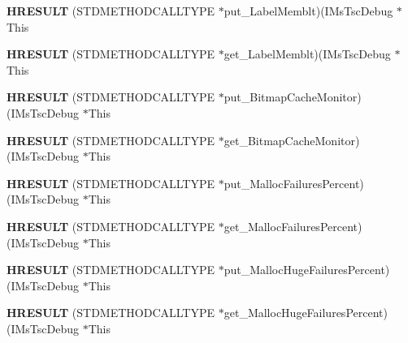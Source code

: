 \begin{DoxyCompactItemize}
{\bfseries H\+R\+E\+S\+U\+LT} (S\+T\+D\+M\+E\+T\+H\+O\+D\+C\+A\+L\+L\+T\+Y\+PE $\ast$put\+\_\+\+Label\+Memblt)(I\+Ms\+Tsc\+Debug $\ast$This
\item 
\mbox{\label{struct_i_ms_tsc_debug_vtbl_a3393a13d7a383c5bce51abc67cae66a9}} 
{\bfseries H\+R\+E\+S\+U\+LT} (S\+T\+D\+M\+E\+T\+H\+O\+D\+C\+A\+L\+L\+T\+Y\+PE $\ast$get\+\_\+\+Label\+Memblt)(I\+Ms\+Tsc\+Debug $\ast$This
\item 
\mbox{\label{struct_i_ms_tsc_debug_vtbl_a1780152519436e2398d70c985d8bd4d4}} 
{\bfseries H\+R\+E\+S\+U\+LT} (S\+T\+D\+M\+E\+T\+H\+O\+D\+C\+A\+L\+L\+T\+Y\+PE $\ast$put\+\_\+\+Bitmap\+Cache\+Monitor)(I\+Ms\+Tsc\+Debug $\ast$This
\item 
\mbox{\label{struct_i_ms_tsc_debug_vtbl_a723ed122b9570bdc695a3d71c12611b9}} 
{\bfseries H\+R\+E\+S\+U\+LT} (S\+T\+D\+M\+E\+T\+H\+O\+D\+C\+A\+L\+L\+T\+Y\+PE $\ast$get\+\_\+\+Bitmap\+Cache\+Monitor)(I\+Ms\+Tsc\+Debug $\ast$This
\item 
\mbox{\label{struct_i_ms_tsc_debug_vtbl_a247854cf9e3be9eb20157c712e710a81}} 
{\bfseries H\+R\+E\+S\+U\+LT} (S\+T\+D\+M\+E\+T\+H\+O\+D\+C\+A\+L\+L\+T\+Y\+PE $\ast$put\+\_\+\+Malloc\+Failures\+Percent)(I\+Ms\+Tsc\+Debug $\ast$This
\item 
\mbox{\label{struct_i_ms_tsc_debug_vtbl_ad0fdbd9df3c02da9f56a82aa52e3c52d}} 
{\bfseries H\+R\+E\+S\+U\+LT} (S\+T\+D\+M\+E\+T\+H\+O\+D\+C\+A\+L\+L\+T\+Y\+PE $\ast$get\+\_\+\+Malloc\+Failures\+Percent)(I\+Ms\+Tsc\+Debug $\ast$This
\item 
\mbox{\label{struct_i_ms_tsc_debug_vtbl_ac30610a5c3dde8a8e31e36161e664033}} 
{\bfseries H\+R\+E\+S\+U\+LT} (S\+T\+D\+M\+E\+T\+H\+O\+D\+C\+A\+L\+L\+T\+Y\+PE $\ast$put\+\_\+\+Malloc\+Huge\+Failures\+Percent)(I\+Ms\+Tsc\+Debug $\ast$This
\item 
\mbox{\label{struct_i_ms_tsc_debug_vtbl_aa5a5f9861d389c205b8521ae66decb2f}} 
{\bfseries H\+R\+E\+S\+U\+LT} (S\+T\+D\+M\+E\+T\+H\+O\+D\+C\+A\+L\+L\+T\+Y\+PE $\ast$get\+\_\+\+Malloc\+Huge\+Failures\+Percent)(I\+Ms\+Tsc\+Debug $\ast$This
\item 

\end{DoxyCompactItemize}
